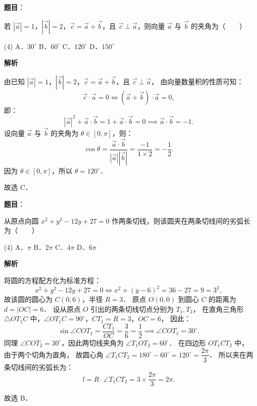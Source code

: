 \begin{answer}

\textbf{题目}：

若 $|\vec{a}| = 1$，$|\vec{b}| = 2$，$\vec{c} = \vec{a} + \vec{b}$，且 $\vec{c} \perp \vec{a}$，则向量 $\vec{a}$ 与 $\vec{b}$ 的夹角为\mbox{（　　）}

\begin{gkopts}(4)
\task A．$30^\circ$
\task B．$60^\circ$
\task C．$120^\circ$
\task D．$150^\circ$
\end{gkopts}

\textbf{解析}

由已知 $|\vec{a}| = 1$，$|\vec{b}| = 2$，$\vec{c} = \vec{a} + \vec{b}$，且 $\vec{c} \perp \vec{a}$，
由向量数量积的性质可知：
\nopagebreak[4]
\[
\vec{c} \cdot \vec{a} = 0 \iff (\vec{a} + \vec{b}) \cdot \vec{a} = 0,
\]
即：
\nopagebreak[4]
\[
|\vec{a}|^2 + \vec{a} \cdot \vec{b} = 1 + \vec{a} \cdot \vec{b} = 0 \implies \vec{a} \cdot \vec{b} = -1.
\]
设向量 $\vec{a}$ 与 $\vec{b}$ 的夹角为 $\theta \in [0, \pi]$，则：
\nopagebreak[4]
\[
\cos\theta = \frac{\vec{a} \cdot \vec{b}}{|\vec{a}| |\vec{b}|} = \frac{-1}{1 \times 2} = -\frac{1}{2}.
\]
因为 $\theta \in [0, \pi]$，所以 $\theta = 120^\circ$．

故选 C．


\end{answer}
\begin{answer}

\textbf{题目}：

从原点向圆 $x^2 + y^2 - 12y + 27 = 0$ 作两条切线，则该圆夹在两条切线间的劣弧长为\mbox{（　　）}

\begin{gkopts}(4)
\task A．$\pi$
\task B．$2\pi$
\task C．$4\pi$
\task D．$6\pi$
\end{gkopts}

\textbf{解析}

将圆的方程配方化为标准方程：
\nopagebreak[4]
\[
x^2 + y^2 - 12y + 27 = 0 \iff x^2 + (y - 6)^2 = 36 - 27 = 9 = 3^2,
\]
故该圆的圆心为 $C(0, 6)$，半径 $R = 3$．
原点 $O(0, 0)$ 到圆心 $C$ 的距离为 $d = |OC| = 6$．
设从原点 $O$ 引出的两条切线切点分别为 $T_1, T_2$，
在直角三角形 $\triangle OT_1C$ 中，$\angle OT_1C = 90^\circ$，$CT_1 = R = 3$，$OC = 6$，
因此：
\nopagebreak[4]
\[
\sin\angle COT_1 = \frac{CT_1}{OC} = \frac{3}{6} = \frac{1}{2} \implies \angle COT_1 = 30^\circ.
\]
同理 $\angle COT_2 = 30^\circ$，因此两切线夹角为 $\angle T_1OT_2 = 60^\circ$．
在四边形 $OT_1CT_2$ 中，由于两个切角为直角，
故圆心角 $\angle T_1CT_2 = 180^\circ - 60^\circ = 120^\circ = \dfrac{2\pi}{3}$．
所以夹在两条切线间的劣弧长为：
\nopagebreak[4]
\[
l = R \cdot \angle T_1CT_2 = 3 \times \frac{2\pi}{3} = 2\pi.
\]

故选 B．


\end{answer}
